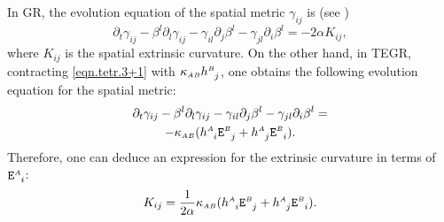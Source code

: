 \documentclass[
10pt, %
a4paper, %
oneside, %
twocolumn,
headinclude,footinclude, %
BCOR5mm, %
]{scrartcl}
\newcommand{\sA}{\mathsmaller A}
\newcommand{\sB}{\mathsmaller B}
\newcommand{\pd}[1]{\partial_{#1}}
\newcommand{\mg}[1]{\kappa_{#1}}			%
\newcommand{\tetrsymbol}{h}
\newcommand{\tetr}[2]{\tetrsymbol^{#1}_{\phantom{#1}#2}}
\newcommand{\detTetr}{\tetrsymbol}
\newcommand{\Efin}[2]{\mathtt{E}^{#1}_{\phantom{#1}#2}}	%
\newcommand{\shift}[1]{\beta^{#1}}
\begin{document}
	In GR, the evolution equation of the spatial metric $ \gamma_{ij} $ is (see 
	\cite[Eq.(7.64)]{RezzollaZanottiBook})
	\begin{equation}\label{eqn.K}
		\pd{t} \gamma_{ij} - \shift{l}\pd{l}\gamma_{ij} - \gamma_{il}\pd{j}\shift{l}
		-\gamma_{jl}\pd{i}\shift{l} = - 2 \alpha K_{ij},
	\end{equation}
	where  $ K_{ij} $ is the spatial extrinsic 
	curvature.
	On the other hand, in TEGR, contracting \eqref{eqn.tetr.3+1} with $ \mg{\sA\sB} \tetr{\sB}{j} 
	$, one 
	obtains 
	the following evolution equation for the spatial metric:
	\begin{multline}\label{eqn.gamma.PDE}
		\pd{t} \gamma_{ij} - \shift{l}\pd{l}\gamma_{ij} - \gamma_{il}\pd{j}\shift{l}
		-\gamma_{jl}\pd{i}\shift{l} = \\
		-\mg{\sA\sB}(\tetr{\sA}{i} \Efin{\sB}{j} + \tetr{\sA}{j} 
		\Efin{\sB}{i}).
	\end{multline} 
	Therefore, one can deduce an expression for the extrinsic curvature in terms of $ 
	\Efin{\sA}{i} $: 
	\begin{equation}\label{key}
		K_{ij} = \frac{1}{2\alpha}\mg{\sA\sB}(\tetr{\sA}{i} \Efin{\sB}{j} + \tetr{\sA}{j} 
		\Efin{\sB}{i}).
	\end{equation}
	
\end{document}
